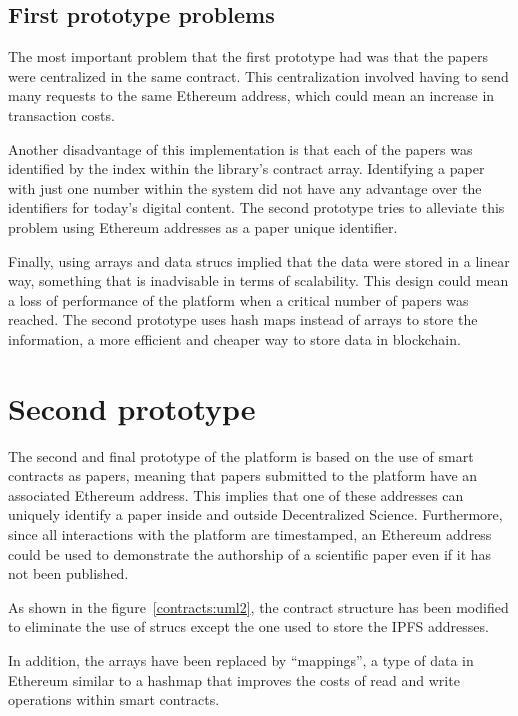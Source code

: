 \subsection*{First prototype problems}
\label{sec:first-prot-probl}

The most important problem that the first prototype had was that the papers were
centralized in the same contract. This centralization involved having to send
many requests to the same Ethereum address, which could mean an increase in
transaction costs.

Another disadvantage of this implementation is that each of the papers was
identified by the index within the library's contract array. Identifying a paper
with just one number within the system did not have any advantage over the
identifiers for today's digital content. The second prototype tries to alleviate
this problem using Ethereum addresses as a paper unique identifier.

Finally, using arrays and data strucs implied that the data were stored in a
linear way, something that is inadvisable in terms of scalability. This design
could mean a loss of performance of the platform when a critical number of
papers was reached. The second prototype uses hash maps instead of arrays to
store the information, a more efficient and cheaper way to store data in
blockchain.


\section{Second prototype}
\label{sec:second-prototype}

The second and final prototype of the platform is based on the use of smart
contracts as papers, meaning that papers submitted to the platform have an
associated Ethereum address. This implies that one of these addresses can
uniquely identify a paper inside and outside Decentralized Science. Furthermore,
since all interactions with the platform are timestamped, an Ethereum address
could be used to demonstrate the authorship of a scientific paper even if it has
not been published.


As shown in the figure~\ref{contracts:uml2}, the contract structure has been
modified to eliminate the use of strucs except the one used to store the IPFS
addresses.

In addition, the arrays have been replaced by ``mappings'', a type of data in
Ethereum similar to a hashmap that improves the costs of read and write
operations within smart contracts.

